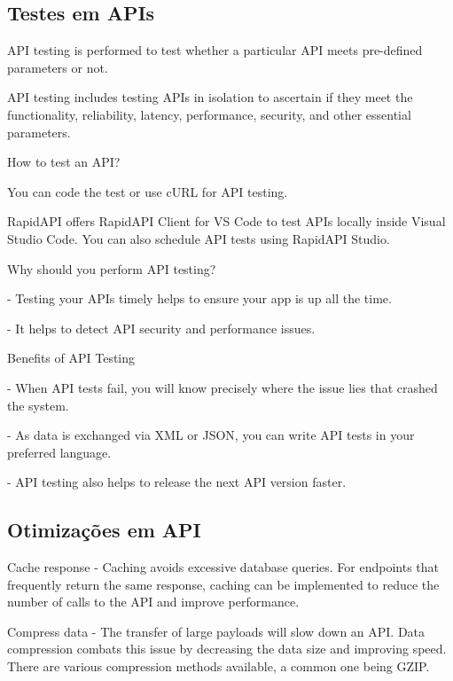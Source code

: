 
\subsection{Testes em APIs}

API testing is performed to test whether a particular API meets pre-defined parameters or not.

API testing includes testing APIs in isolation to ascertain if they meet the functionality, reliability, latency, performance, security, and other essential parameters.

How to test an API?

You can code the test or use cURL for API testing. 

RapidAPI offers RapidAPI Client for VS Code to test APIs locally inside Visual Studio Code. You can also schedule API tests using RapidAPI Studio.

Why should you perform API testing?

- Testing your APIs timely helps to ensure your app is up all the time.

- It helps to detect API security and performance issues.

Benefits of API Testing

- When API tests fail, you will know precisely where the issue lies that crashed the system.

- As data is exchanged via XML or JSON, you can write API tests in your preferred language.

- API testing also helps to release the next API version faster. \cite{rapidAPI-testing}

\subsection{Otimizações em API}

Cache response - Caching avoids excessive database queries. For endpoints that frequently return the same response, caching can be implemented to reduce the number of calls to the API and improve performance.

Compress data - The transfer of large payloads will slow down an API. Data compression combats this issue by decreasing the data size and improving speed. There are various compression methods available, a common one being GZIP.

